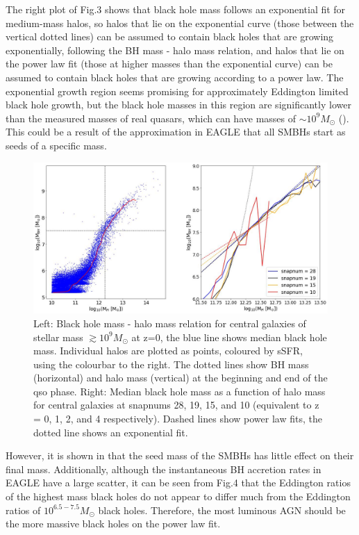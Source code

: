 \documentclass[12pt, twocolumn]{report}%
\begin{document}
The right plot of Fig.3 shows that black hole mass follows an exponential fit for medium-mass halos, so halos that lie on the exponential curve (those between the vertical dotted lines) can be assumed to contain black holes that are growing exponentially, following the BH mass - halo mass relation, and halos that lie on the power law fit (those at higher masses than the exponential curve) can be assumed to contain black holes that are growing according to a power law. The exponential growth region seems promising for approximately Eddington limited black hole growth, but the black hole masses in this region are significantly lower than the measured masses of real quasars, which can have masses of $\sim10^9M_\odot$ (\cite{Marshall}). This could be a result of the approximation in EAGLE that all SMBHs start as seeds of a specific mass.

\onecolumngrid


\begin{figure}[H]
\centering
\includegraphics[width=17cm]{Plot_3.jpeg}
\caption{Left: Black hole mass - halo mass relation for central galaxies of stellar mass $\gtrsim10^9M_\odot$ at z=0, the blue line shows median black hole mass. Individual halos are plotted as points, coloured by sSFR, using the colourbar to the right. The dotted lines show BH mass (horizontal) and halo mass (vertical) at the beginning and end of the qso phase. Right: Median black hole mass as a function of halo mass for central galaxies at snapnums 28, 19, 15, and 10 (equivalent to z = 0, 1, 2, and 4 respectively). Dashed lines show power law fits, the dotted line shows an exponential fit.}
\label{fig:3}
\end{figure}
\twocolumngrid


 \noindent However, it is shown in \cite{Quasar} that the seed mass of the SMBHs has little effect on their final mass. Additionally, although the instantaneous BH accretion rates in EAGLE have a large scatter, it can be seen from Fig.4 that the Eddington ratios of the highest mass black holes do not appear to differ much from the Eddington ratios of $10^{6.5-7.5}M_\odot$ black holes. Therefore, the most luminous AGN should be the more massive black holes on the power law fit.\par
\end{document}
